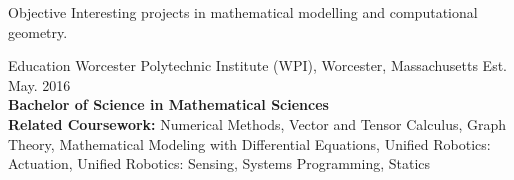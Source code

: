 \documentclass{./sjkelly_resume} 					%
\begin{document}

\begin{mainSection}{Objective}
	Interesting projects in mathematical modelling and computational geometry.
\end{mainSection}

\begin{mainSection}{Education}
	{Worcester Polytechnic Institute (WPI)}, {Worcester, Massachusetts} \hfill {Est. May. 2016 } \\ 
	\textbf{Bachelor of Science in Mathematical Sciences}\\
	{\small {\bf Related Coursework:} Numerical Methods, Vector and Tensor Calculus, Graph Theory, Mathematical Modeling with Differential Equations, Unified Robotics: Actuation, Unified Robotics: Sensing, Systems Programming, Statics}
\end{mainSection}
\end{document}
